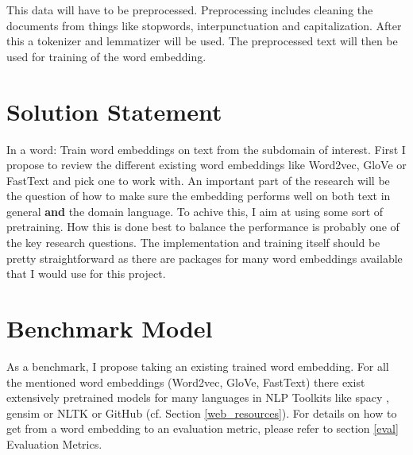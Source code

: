 \documentclass[10pt,a4paper]{article}
\begin{document}
	This data will have to be preprocessed. Preprocessing includes cleaning the documents from things like stopwords, interpunctuation and capitalization. After this a tokenizer and lemmatizer will be used. The preprocessed text will then be used for training of the word embedding.
	
	\section{Solution Statement}
	In a word: Train word embeddings on text from the subdomain of interest.
	First I propose to review the different existing word embeddings like Word2vec, GloVe or  FastText and pick one to work with. An important part of the research will be the question of how to make sure the embedding performs well on both text in general \textbf{and} the domain language. To achive this, I aim at using some sort of pretraining. How this is done best to balance the performance is probably one of the key research questions.
	The implementation and training itself should be pretty straightforward as there are packages for many word embeddings available that I would use for this project.
	
	\section{Benchmark Model}
	As a benchmark, I propose taking an existing trained word embedding. For all the mentioned word embeddings (Word2vec, GloVe, FastText) there exist extensively pretrained models for many languages in NLP Toolkits like spacy \cite{spacy2}, gensim \cite{rehurek_lrec} or NLTK \cite{Loper:2002:NNL:1118108.1118117} or GitHub (cf. Section \ref{web_resources}). For details on how to get from a word embedding to an evaluation metric, please refer to section \ref{eval} Evaluation Metrics.
	
\end{document}
